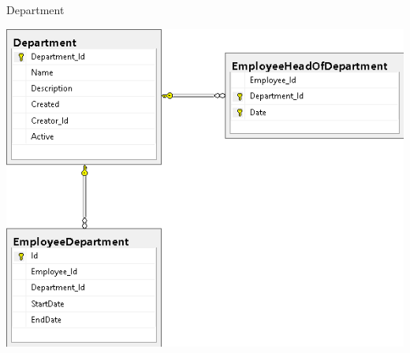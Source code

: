 \begin{frame}{Department}
  \begin{center}
    \includegraphics[height=0.9\textheight]{images/database/department.png}
  \end{center}
\end{frame}